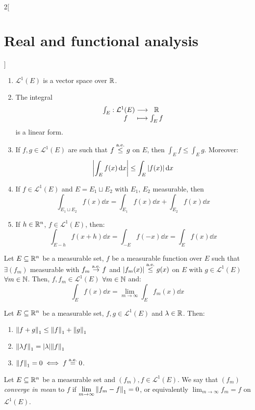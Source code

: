 \documentclass[../../../main_math.tex]{subfiles}
\begin{document}
\begin{multicols}{2}[\section{Real and functional analysis}]
\begin{proposition}
    \begin{enumerate}
      \item $ \mathcal{L}^1(E)$ is a vector space over $\mathbb{R}$.
      \item The integral $$\function{\int_E}{ \mathcal{L}^1(E)}{\RR}{f}{\int_Ef}$$ is a linear form.
      \item If $f,g\in \mathcal{L}^1(E)$ are such that $f\overset{\text{a.e.}}{\leq} g$ on $E$, then $\int_E f\leq\int_E g$. Moreover: $$\abs{\int_Ef(x)\dd{x}}\leq \int_E\abs{f(x)}\dd{x}$$
      \item If $f\in \mathcal{L}^1(E)$ and $E=E_1\sqcup E_2$ with $E_1$, $E_2$ measurable, then $$\int_{E_1\sqcup E_2}f(x)\dd{x}=\int_{E_1}f(x)\dd{x}+\int_{E_2}f(x)\dd{x}$$
      \item If $h\in\mathbb{R}^n$, $f\in \mathcal{L}^1(E)$, then: $$\int_{E-h}f(x+h)\dd{x}=\int_{-E}f(-x)\dd{x}=\int_{E}f(x)\dd{x}$$
    \end{enumerate}
  \end{proposition}
  \begin{important}
    \begin{theorem}\label{RFA:dominated}
      Let $E\subseteq\mathbb{R}^n$ be a measurable set, $f$ be a measurable function over $E$ such that $\exists (f_m)$ measurable with $f_m\overset{\text{a.e.}}{\rightarrow} f$ and $\abs{f_m(x)}\overset{\text{a.e.}}{\leq} g(x)$ on $E$ with $g\in \mathcal{L}^1(E)$ $\forall m\in\mathbb{N}$. Then, $f, f_m\in \mathcal{L}^1(E)$ $\forall m\in\mathbb{N}$ and: $$\int_Ef(x)\dd{x}=\lim_{m\to\infty}\int_Ef_m(x)\dd{x}$$
    \end{theorem}
  \end{important}
  \begin{proposition}
    Let $E\subseteq\mathbb{R}^n$ be a measurable set, $f,g\in \mathcal{L}^1(E)$ and $\lambda\in\mathbb{R}$. Then:
    \begin{enumerate}
      \item ${\left\|f+g\right\|}_1\leq{\left\|f\right\|}_1+{\left\|g\right\|}_1$
      \item ${\left\|\lambda f\right\|}_1=\abs{\lambda}{\left\|f\right\|}_1$
      \item ${\left\|f\right\|}_1=0\iff f\overset{\text{a.e.}}{=}0$.
    \end{enumerate}
  \end{proposition}
  \begin{definition}
    Let $E\subseteq\mathbb{R}^n$ be a measurable set and $(f_m),f\in \mathcal{L}^1(E)$. We say that $(f_m)$ \emph{converge in mean} to $f$ if $\displaystyle\lim_{m\to\infty}{\left\|f_m-f\right\|}_1=0$, or equivalently $\displaystyle\lim_{m\to\infty} f_m=f$ on $ \mathcal{L}^1(E)$.

\end{definition}
\end{multicols}
\end{document}
